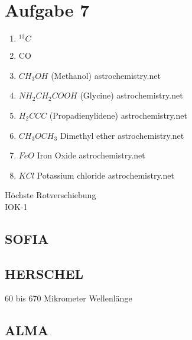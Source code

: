 \section{Aufgabe 7}

\begin{enumerate}
10 Mohlekühle
\item $^{13}C$
\item CO
\item $CH_{3}OH$ (Methanol) astrochemistry.net
\item $NH_2CH_2COOH$ (Glycine) astrochemistry.net
\item $H_2CCC$ (Propadienylidene) astrochemistry.net
\item $CH_3OCH_3$ Dimethyl ether astrochemistry.net
\item $FeO$	Iron Oxide astrochemistry.net
\item $KCl$	Potassium chloride astrochemistry.net
\end{enumerate}
Höchste Rotverschiebung \\
IOK-1 \cite{iye2006galaxy}
\subsection{SOFIA}
\subsection{HERSCHEL}
60 bis 670 Mikrometer Wellenlänge
\subsection{ALMA}



